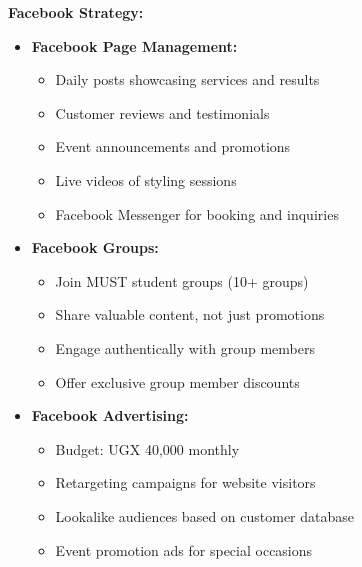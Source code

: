 \textbf{Facebook Strategy:}
\begin{itemize}[leftmargin=2em]
    \item \textbf{Facebook Page Management:}
    \begin{itemize}
        \item Daily posts showcasing services and results
        \item Customer reviews and testimonials
        \item Event announcements and promotions
        \item Live videos of styling sessions
        \item Facebook Messenger for booking and inquiries
    \end{itemize}
    
    \item \textbf{Facebook Groups:}
    \begin{itemize}
        \item Join MUST student groups (10+ groups)
        \item Share valuable content, not just promotions
        \item Engage authentically with group members
        \item Offer exclusive group member discounts
    \end{itemize}
    
    \item \textbf{Facebook Advertising:}
    \begin{itemize}
        \item Budget: UGX 40,000 monthly
        \item Retargeting campaigns for website visitors
        \item Lookalike audiences based on customer database
        \item Event promotion ads for special occasions
    \end{itemize}
\end{itemize}

